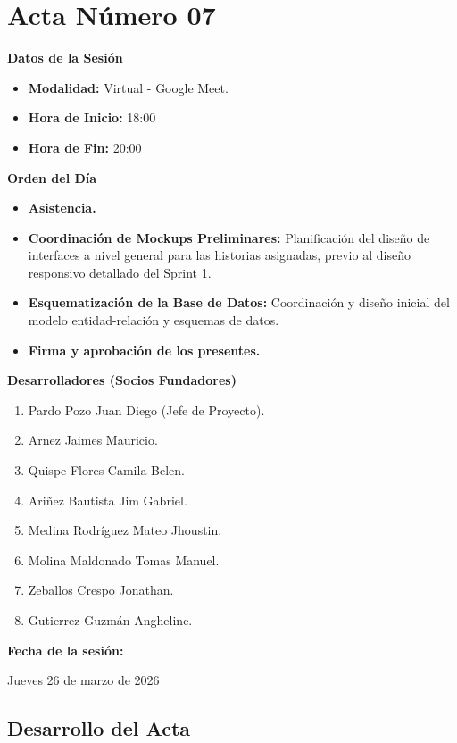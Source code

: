 \newpage
\section{Acta Número 07}
\label{sec:acta07}

\noindent \textbf{Datos de la Sesión}
\begin{itemize}[noitemsep]
    \item \textbf{Modalidad:} Virtual - Google Meet.
    \item \textbf{Hora de Inicio:} 18:00
    \item \textbf{Hora de Fin:} 20:00
\end{itemize}

\noindent \textbf{Orden del Día}
\begin{itemize}[noitemsep]
    \item \textbf{Asistencia.}
    \item \textbf{Coordinación de Mockups Preliminares:} Planificación del diseño de interfaces a nivel general para las historias asignadas, previo al diseño responsivo detallado del Sprint 1.
    \item \textbf{Esquematización de la Base de Datos:} Coordinación y diseño inicial del modelo entidad-relación y esquemas de datos.
    \item \textbf{Firma y aprobación de los presentes.}
\end{itemize}

\noindent \textbf{Desarrolladores (Socios Fundadores)}
\begin{enumerate}[noitemsep]
    \item Pardo Pozo Juan Diego (Jefe de Proyecto).
    \item Arnez Jaimes Mauricio.
    \item Quispe Flores Camila Belen.
    \item Ariñez Bautista Jim Gabriel.
    \item Medina Rodríguez Mateo Jhoustin.
    \item Molina Maldonado Tomas Manuel.
    \item Zeballos Crespo Jonathan.
    \item Gutierrez Guzmán Angheline.
\end{enumerate}

\noindent \textbf{Fecha de la sesión:}\par
Jueves 26 de marzo de 2026

\newpage
\subsection{Desarrollo del Acta}

